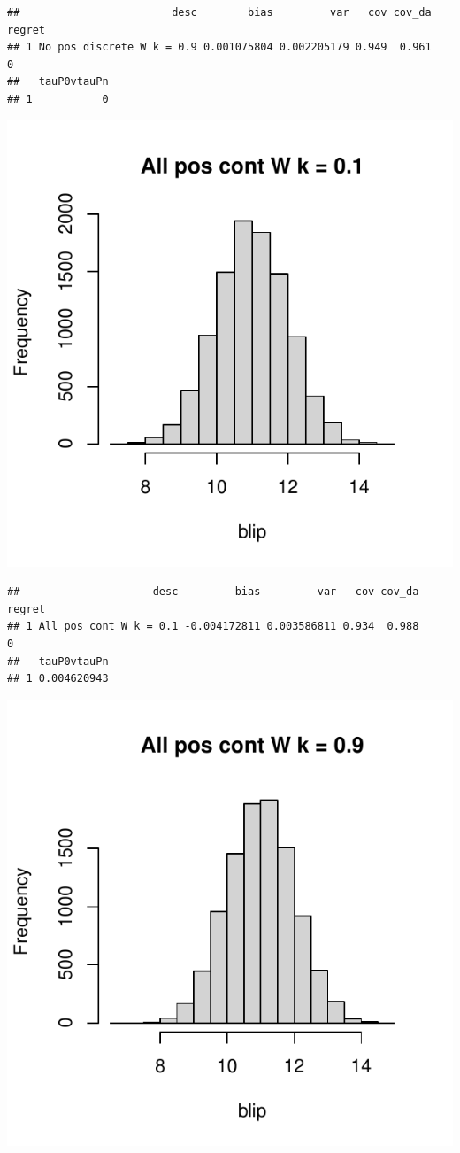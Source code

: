 \documentclass[11pt]{article}\usepackage[]{graphicx}\usepackage[table]{xcolor}
\makeatletter
\def\maxwidth{ %
  \ifdim\Gin@nat@width>\linewidth
    \linewidth
  \else
    \Gin@nat@width
  \fi
}
\newenvironment{kframe}{%
 \def\at@end@of@kframe{}%
 \ifinner\ifhmode%
  \def\at@end@of@kframe{\end{minipage}}%
  \begin{minipage}{\columnwidth}%
 \fi\fi%
 \def\FrameCommand##1{\hskip\@totalleftmargin \hskip-\fboxsep
 \colorbox{shadecolor}{##1}\hskip-\fboxsep
     \hskip-\linewidth \hskip-\@totalleftmargin \hskip\columnwidth}%
 \MakeFramed {\advance\hsize-\width
   \@totalleftmargin\z@ \linewidth\hsize
   \@setminipage}}%
 {\par\unskip\endMakeFramed%
 \at@end@of@kframe}
\newenvironment{knitrout}{}{} %
\makeatother
\begin{document}
\begin{knitrout}
\begin{kframe}\begin{verbatim}
##                        desc        bias         var   cov cov_da regret
## 1 No pos discrete W k = 0.9 0.001075804 0.002205179 0.949  0.961      0
##   tauP0vtauPn
## 1           0
\end{verbatim}
\end{kframe}
\includegraphics[width=\maxwidth]{figure/unnamed-chunk-4-7} 
\begin{kframe}\begin{verbatim}
##                     desc         bias         var   cov cov_da regret
## 1 All pos cont W k = 0.1 -0.004172811 0.003586811 0.934  0.988      0
##   tauP0vtauPn
## 1 0.004620943
\end{verbatim}
\end{kframe}
\includegraphics[width=\maxwidth]{figure/unnamed-chunk-4-8} 

\end{knitrout}
\end{document}
